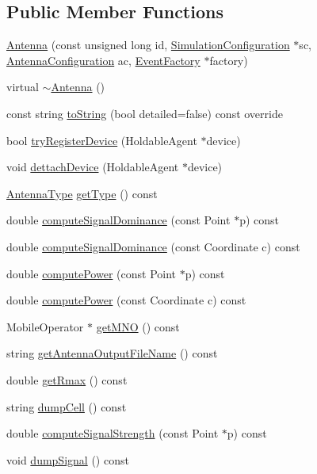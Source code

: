 \subsection*{Public Member Functions}
\begin{DoxyCompactItemize}
\item 
\hyperlink{class_antenna_a3ffd61a2c9634c3cb6449c6b1e2d0ff8}{Antenna} (const unsigned long id, \hyperlink{class_simulation_configuration}{Simulation\+Configuration} $\ast$sc, \hyperlink{class_antenna_configuration}{Antenna\+Configuration} ac, \hyperlink{class_event_factory}{Event\+Factory} $\ast$factory)
\item 
virtual \hyperlink{class_antenna_ad7b98073b970db5d6bc83c5c5961fe44}{$\sim$\+Antenna} ()
\item 
const string \hyperlink{class_antenna_afc5cb8c8fae1a251cf8c5bc6c43ff692}{to\+String} (bool detailed=false) const override
\item 
bool \hyperlink{class_antenna_a4455f5c804e1ea520dd849dc9fd7b0b4}{try\+Register\+Device} (Holdable\+Agent $\ast$device)
\item 
void \hyperlink{class_antenna_a983a0784315567c2ab6ac1820cf558c5}{dettach\+Device} (Holdable\+Agent $\ast$device)
\item 
\hyperlink{_antenna_type_8h_a7b678b5cb9dedc607131200119d96b16}{Antenna\+Type} \hyperlink{class_antenna_adf45a8b339956741bf8dcb5361f5f249}{get\+Type} () const
\item 
double \hyperlink{class_antenna_ad5e95089dd452dfee52194d2955a7b76}{compute\+Signal\+Dominance} (const Point $\ast$p) const
\item 
double \hyperlink{class_antenna_aadb456a9cce4ed0c7b6e4d15a084f359}{compute\+Signal\+Dominance} (const Coordinate c) const
\item 
double \hyperlink{class_antenna_a7caa8004be14f97db64fdf7ae46d6c97}{compute\+Power} (const Point $\ast$p) const
\item 
double \hyperlink{class_antenna_a0192376f8702c5300fe1f13ce267b305}{compute\+Power} (const Coordinate c) const
\item 
Mobile\+Operator $\ast$ \hyperlink{class_antenna_abfbb4a654f73fe0c3a30f50777f79349}{get\+M\+NO} () const
\item 
string \hyperlink{class_antenna_a7a3919b137b91c1f8f13d620bc7657ed}{get\+Antenna\+Output\+File\+Name} () const
\item 
double \hyperlink{class_antenna_adf33d1b0be85f95c543a31dc1b3159f5}{get\+Rmax} () const
\item 
string \hyperlink{class_antenna_a8ed18205ff7c675868090e4c80454c2c}{dump\+Cell} () const
\item 
double \hyperlink{class_antenna_a228297a3cb00c11fab97d615b4817656}{compute\+Signal\+Strength} (const Point $\ast$p) const
\item 
void \hyperlink{class_antenna_ad78e7561bf98d891262e6436cd3e1df7}{dump\+Signal} () const
\end{DoxyCompactItemize}
